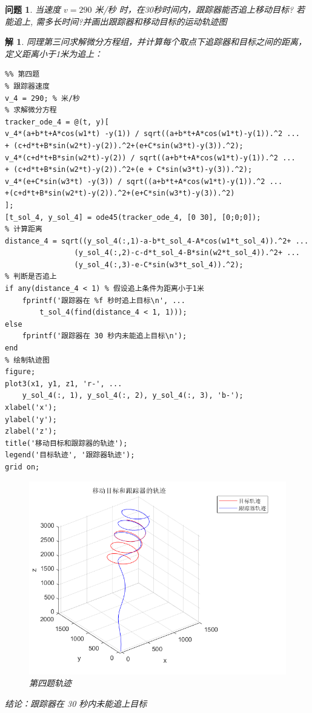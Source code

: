 \documentclass[a4paper, 12pt]{ctexart}
\newtheorem*{theorem}{解}
\newtheorem*{example}{问题}
\begin{document}
\begin{example}
    当速度 $v=290$ 米/秒 时，在30秒时间内，跟踪器能否追上移动目标? 若能追上,
    需多长时间?并画出跟踪器和移动目标的运动轨迹图
\end{example}


\begin{theorem}
    同理第三问求解微分方程组，并计算每个取点下追踪器和目标之间的距离，定义距离小于1米为追上：
\begin{lstlisting}
%% 第四题
% 跟踪器速度
v_4 = 290; % 米/秒
% 求解微分方程
tracker_ode_4 = @(t, y)[
v_4*(a+b*t+A*cos(w1*t) -y(1)) / sqrt((a+b*t+A*cos(w1*t)-y(1)).^2 ...
+ (c+d*t+B*sin(w2*t)-y(2)).^2+(e+C*sin(w3*t)-y(3)).^2);
v_4*(c+d*t+B*sin(w2*t)-y(2)) / sqrt((a+b*t+A*cos(w1*t)-y(1)).^2 ...
+ (c+d*t+B*sin(w2*t)-y(2)).^2+(e + C*sin(w3*t)-y(3)).^2);
v_4*(e+C*sin(w3*t) -y(3)) / sqrt((a+b*t+A*cos(w1*t)-y(1)).^2 ...
+(c+d*t+B*sin(w2*t)-y(2)).^2+(e+C*sin(w3*t)-y(3)).^2)
];
[t_sol_4, y_sol_4] = ode45(tracker_ode_4, [0 30], [0;0;0]);
% 计算距离
distance_4 = sqrt((y_sol_4(:,1)-a-b*t_sol_4-A*cos(w1*t_sol_4)).^2+ ...
                (y_sol_4(:,2)-c-d*t_sol_4-B*sin(w2*t_sol_4)).^2+ ...
                (y_sol_4(:,3)-e-C*sin(w3*t_sol_4)).^2);
% 判断是否追上
if any(distance_4 < 1) % 假设追上条件为距离小于1米
    fprintf('跟踪器在 %f 秒时追上目标\n', ...
        t_sol_4(find(distance_4 < 1, 1)));
else
    fprintf('跟踪器在 30 秒内未能追上目标\n');
end
% 绘制轨迹图
figure;
plot3(x1, y1, z1, 'r-', ...
    y_sol_4(:, 1), y_sol_4(:, 2), y_sol_4(:, 3), 'b-');
xlabel('x');
ylabel('y');
zlabel('z');
title('移动目标和跟踪器的轨迹');
legend('目标轨迹', '跟踪器轨迹');
grid on;
\end{lstlisting}
\begin{figure}[h]
    \centering
    \includegraphics[width=5in]{pic/t4.png}
    \caption*{第四题轨迹}
\end{figure}
结论：跟踪器在 30 秒内未能追上目标
\end{theorem}
\end{document}
